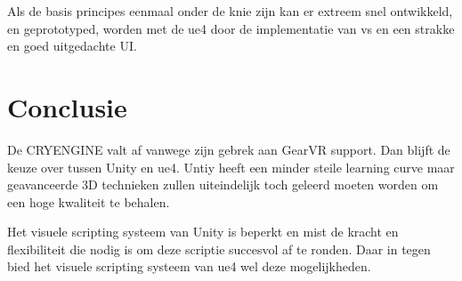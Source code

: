 Als de basis principes eenmaal onder de knie zijn kan er extreem snel ontwikkeld, en geprototyped, worden met de \gls{ue4} door de implementatie van \gls{vs} en een strakke en goed uitgedachte UI.

\section{Conclusie}
De CRYENGINE valt af vanwege zijn gebrek aan GearVR support. Dan blijft de keuze over tussen Unity en \gls{ue4}. Untiy heeft een minder steile learning curve maar geavanceerde 3D technieken zullen uiteindelijk toch geleerd moeten worden om een hoge kwaliteit te behalen. 

Het visuele scripting systeem van Unity is beperkt en mist de kracht en flexibiliteit die nodig is om deze scriptie succesvol af te ronden. Daar in tegen bied het visuele scripting systeem van \gls{ue4} wel deze mogelijkheden.
